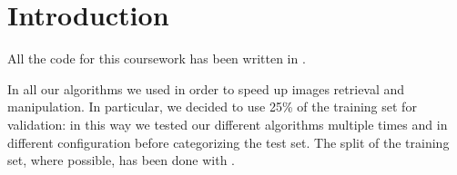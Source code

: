 \clearpage
\section{Introduction}
All the code for this coursework has been written in \MATLAB. 

In all our algorithms we used  in order to speed up images retrieval and manipulation. In particular, we decided to use 25\% of the training set for validation: in this way we tested our different algorithms multiple times and in different configuration before categorizing the test set. The split of the training set, where possible, has been done with .